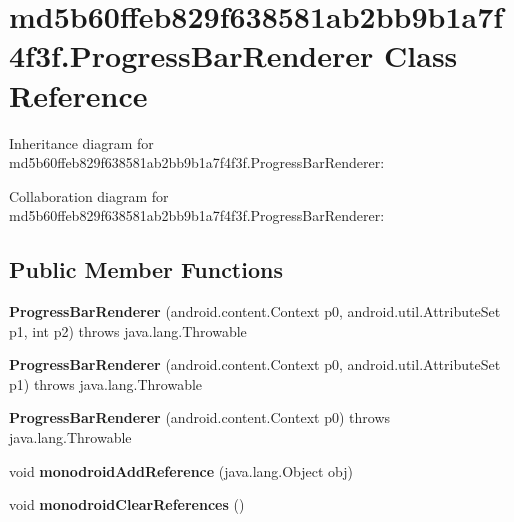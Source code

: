 \hypertarget{classmd5b60ffeb829f638581ab2bb9b1a7f4f3f_1_1_progress_bar_renderer}{}\section{md5b60ffeb829f638581ab2bb9b1a7f4f3f.\+Progress\+Bar\+Renderer Class Reference}
\label{classmd5b60ffeb829f638581ab2bb9b1a7f4f3f_1_1_progress_bar_renderer}


Inheritance diagram for md5b60ffeb829f638581ab2bb9b1a7f4f3f.\+Progress\+Bar\+Renderer\+:


Collaboration diagram for md5b60ffeb829f638581ab2bb9b1a7f4f3f.\+Progress\+Bar\+Renderer\+:
\subsection*{Public Member Functions}
\begin{DoxyCompactItemize}
\item 
\mbox{\label{classmd5b60ffeb829f638581ab2bb9b1a7f4f3f_1_1_progress_bar_renderer_a941a4c014f87f9892f1b14f44446d83e}} 
{\bfseries Progress\+Bar\+Renderer} (android.\+content.\+Context p0, android.\+util.\+Attribute\+Set p1, int p2)  throws java.\+lang.\+Throwable 	
\item 
\mbox{\label{classmd5b60ffeb829f638581ab2bb9b1a7f4f3f_1_1_progress_bar_renderer_a52dcb02f00d412da68b7ca790ffb2956}} 
{\bfseries Progress\+Bar\+Renderer} (android.\+content.\+Context p0, android.\+util.\+Attribute\+Set p1)  throws java.\+lang.\+Throwable 	
\item 
\mbox{\label{classmd5b60ffeb829f638581ab2bb9b1a7f4f3f_1_1_progress_bar_renderer_a376f162b961385dc3a452ce65fe97037}} 
{\bfseries Progress\+Bar\+Renderer} (android.\+content.\+Context p0)  throws java.\+lang.\+Throwable 	
\item 
\mbox{\label{classmd5b60ffeb829f638581ab2bb9b1a7f4f3f_1_1_progress_bar_renderer_a202f5798a458806f96e04ca5e9dffe33}} 
void {\bfseries monodroid\+Add\+Reference} (java.\+lang.\+Object obj)
\item 
\mbox{\label{classmd5b60ffeb829f638581ab2bb9b1a7f4f3f_1_1_progress_bar_renderer_ac94ee2b4c29a46b82c4caf81da54a9bc}} 
void {\bfseries monodroid\+Clear\+References} ()
\end{DoxyCompactItemize}
